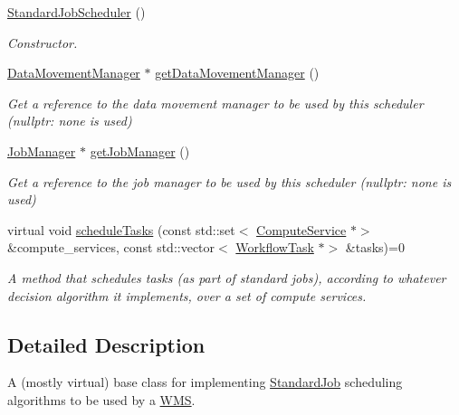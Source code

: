 \begin{DoxyCompactItemize}
\item 
\mbox{\label{classwrench_1_1_standard_job_scheduler_ac71c8f05963604731837d324061bde0b}} 
\hyperlink{classwrench_1_1_standard_job_scheduler_ac71c8f05963604731837d324061bde0b}{Standard\+Job\+Scheduler} ()
\begin{DoxyCompactList}\small\item\em Constructor. \end{DoxyCompactList}\item 
\hyperlink{classwrench_1_1_data_movement_manager}{Data\+Movement\+Manager} $\ast$ \hyperlink{classwrench_1_1_standard_job_scheduler_af570fb0bd50992704a8546d33e644a22}{get\+Data\+Movement\+Manager} ()
\begin{DoxyCompactList}\small\item\em Get a reference to the data movement manager to be used by this scheduler (nullptr\+: none is used) \end{DoxyCompactList}\item 
\hyperlink{classwrench_1_1_job_manager}{Job\+Manager} $\ast$ \hyperlink{classwrench_1_1_standard_job_scheduler_a95d72ffb0b6609899bdca37b230c5f8b}{get\+Job\+Manager} ()
\begin{DoxyCompactList}\small\item\em Get a reference to the job manager to be used by this scheduler (nullptr\+: none is used) \end{DoxyCompactList}\item 
virtual void \hyperlink{classwrench_1_1_standard_job_scheduler_a1ef07acfece4706f7f172c740a8015c3}{schedule\+Tasks} (const std\+::set$<$ \hyperlink{classwrench_1_1_compute_service}{Compute\+Service} $\ast$$>$ \&compute\+\_\+services, const std\+::vector$<$ \hyperlink{classwrench_1_1_workflow_task}{Workflow\+Task} $\ast$$>$ \&tasks)=0
\begin{DoxyCompactList}\small\item\em A method that schedules tasks (as part of standard jobs), according to whatever decision algorithm it implements, over a set of compute services. \end{DoxyCompactList}\end{DoxyCompactItemize}


\subsection{Detailed Description}
A (mostly virtual) base class for implementing \hyperlink{classwrench_1_1_standard_job}{Standard\+Job} scheduling algorithms to be used by a \hyperlink{classwrench_1_1_w_m_s}{W\+MS}. 

